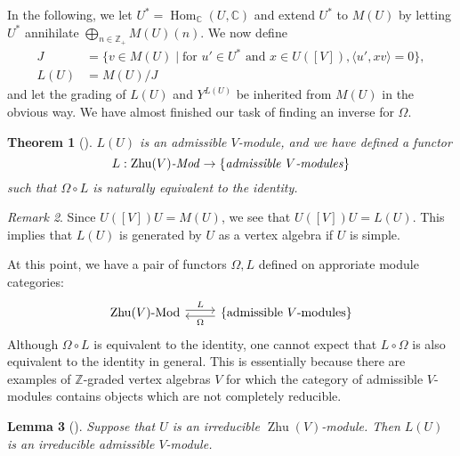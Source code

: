 \documentclass[a4paper, 12pt, reqno]{amsart}
\newtheorem{theorem}{Theorem}[section]
\newtheorem{lemma}[theorem]{Lemma}
\theoremstyle{remark}
\newtheorem{remark}[theorem]{Remark}
\numberwithin{equation}{subsection}
\DeclareMathOperator{\Hom}{Hom}
\DeclareMathOperator{\Zhu}{Zhu}
\begin{document}
In the following, we let $U^* = \Hom_{\mathbb{C}}(U, \mathbb{C})$ and extend $U^*$ to $M(U)$ by letting $U^*$ annihilate $\bigoplus_{n \in \mathbb{Z}_+}M(U)(n)$.
We now define
\begin{align*}
  J &= \{v \in M(U) \mid \text{for }u' \in U^*\text{ and }x \in U([V]), \langle u', xv\rangle = 0\}, \\
  L(U) &= M(U)/J
\end{align*}
and let the grading of $L(U)$ and $Y^{L(U)}$ be inherited from $M(U)$ in the obvious way.
We have almost finished our task of finding an inverse for $\Omega$.

\begin{theorem}[{\cite[Theorem 6.3]{dong_twisted_1998}}]
  \label{thr:38}
  $L(U)$ is an admissible $V$-module, and we have defined a functor
  \begin{equation*}
    L: \Zhu(V)\text{\emph{-Mod}} \to \{\text{\emph{admissible }}V\text{\emph{-modules}}\}
  \end{equation*}
  such that $\Omega\circ L$ is naturally equivalent to the identity.
\end{theorem}

\begin{remark}
  \label{rmk:31}
  Since $U([V])U = M(U)$, we see that $U([V])U = L(U)$.
  This implies that $L(U)$ is generated by $U$ as a vertex algebra if $U$ is simple.
\end{remark}

At this point, we have a pair of functors $\Omega, L$ defined on approriate module categories:
\begin{equation*}
  \begin{tikzcd}
    \Zhu(V)\text{-Mod} \arrow[r, "L", shift left] & \{\text{admissible }V\text{-modules}\} \arrow[l, "\Omega", shift left]
  \end{tikzcd}
\end{equation*}
Although $\Omega \circ L$ is equivalent to the identity, one cannot expect that $L \circ \Omega$ is also equivalent to the identity in general.
This is essentially because there are examples of $\mathbb{Z}$-graded vertex algebras $V$ for which the category of admissible $V$-modules contains objects which are not completely reducible.

\begin{lemma}[{\cite[Lemma 7.1]{dong_twisted_1998}}]
  \label{lmm:21}
  Suppose that $U$ is an irreducible $\Zhu(V)$-module.
  Then $L(U)$ is an irreducible admissible $V$-module.
\end{lemma}
\end{document}
